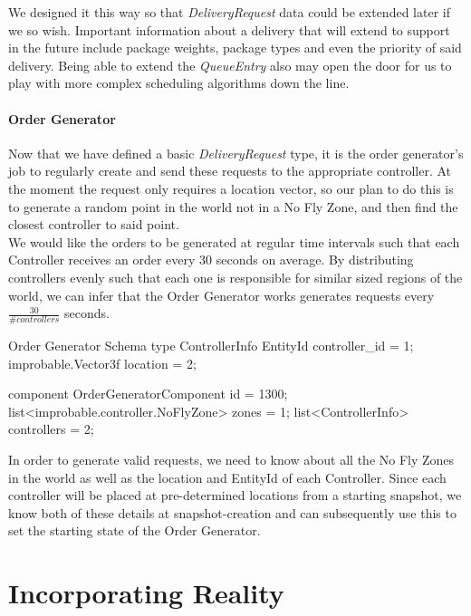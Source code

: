 \documentclass[a4paper,11pt,titlepage]{report}
\begin{document}
We designed it this way so that \textit{DeliveryRequest} data could be extended later if we so wish. Important information about a delivery that will extend to support in the future include package weights, package types and even the priority of said delivery. Being able to extend the \textit{QueueEntry} also may open the door for us to play with more complex scheduling algorithms down the line.

\subsection{Order Generator}
Now that we have defined a basic \textit{DeliveryRequest} type, it is the order generator's job to regularly create and send these requests to the appropriate controller. At the moment the request only requires a location vector, so our plan to do this is to generate a random point in the world not in a No Fly Zone, and then find the closest controller to said point.\\

We would like the orders to be generated at regular time intervals such that each Controller receives an order every 30 seconds on average. By distributing controllers evenly such that each one is responsible for similar sized regions of the world, we can infer that the Order Generator works generates requests every $\frac{30}{\#controllers}$ seconds.\\

\begin{sexylisting}[colback=white]{Order Generator Schema}
type ControllerInfo {
  EntityId controller_id = 1;
  improbable.Vector3f location = 2;
}

component OrderGeneratorComponent {
  id = 1300;
  list<improbable.controller.NoFlyZone> zones = 1;
  list<ControllerInfo> controllers = 2;
}
\end{sexylisting}

\clearpage
In order to generate valid requests, we need to know about all the No Fly Zones in the world as well as the location and EntityId of each Controller. Since each controller will be placed at pre-determined locations from a starting snapshot, we know both of these details at snapshot-creation and can subsequently use this to set the starting state of the Order Generator.

\part{Incorporating Reality}
\end{document}
